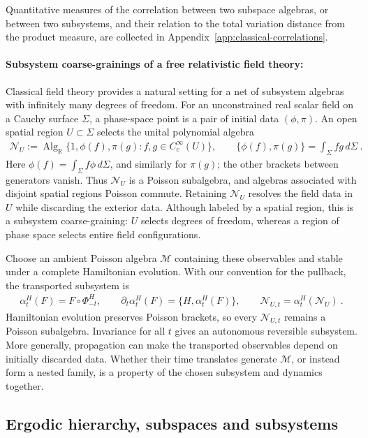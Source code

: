 \documentclass[a4paper,11pt]{article}
\theoremstyle{definition}
\begin{document}
Quantitative measures of the correlation between two subspace algebras, or between two subsystems, and their relation to the total variation distance from the product measure, are collected in Appendix~\ref{app:classical-correlations}.

\paragraph{Subsystem coarse-grainings of a free relativistic field theory:} Classical field theory provides a natural setting for a net of subsystem algebras with infinitely many degrees of freedom. For an unconstrained real scalar field on a Cauchy surface $\Sigma$, a phase-space point is a pair of initial data $(\phi,\pi)$. An open spatial region $U\subset\Sigma$ selects the unital polynomial algebra
\begin{align}
    \mathcal N_U
    :=\operatorname{Alg}_{\mathbb R}\{1,\phi(f),\pi(g):f,g\in C_c^\infty(U)\},
    \qquad
    \{\phi(f),\pi(g)\}=\int_\Sigma fg\,d\Sigma\ .
\end{align}
Here $\phi(f)=\int_\Sigma f\phi\,d\Sigma$, and similarly for $\pi(g)$; the other brackets between generators vanish. Thus $\mathcal N_U$ is a Poisson subalgebra, and algebras associated with disjoint spatial regions Poisson commute. Retaining $\mathcal N_U$ resolves the field data in $U$ while discarding the exterior data. Although labeled by a spatial region, this is a subsystem coarse-graining: $U$ selects degrees of freedom, whereas a region of phase space selects entire field configurations.


Choose an ambient Poisson algebra $\mathcal M$ containing these observables and stable under a complete Hamiltonian evolution. With our convention for the pullback, the transported subsystem is
\begin{align}
    \alpha_t^H(F)=F\circ\Phi_{-t}^H,
    \qquad \partial_t\alpha_t^H(F)=\{H,\alpha_t^H(F)\},
    \qquad \mathcal N_{U,t}=\alpha_t^H(\mathcal N_U)\ .
\end{align}
Hamiltonian evolution preserves Poisson brackets, so every $\mathcal N_{U,t}$ remains a Poisson subalgebra. Invariance for all $t$ gives an autonomous reversible subsystem. More generally, propagation can make the transported observables depend on initially discarded data. Whether their time translates generate $\mathcal M$, or instead form a nested family, is a property of the chosen subsystem and dynamics together.


\subsection{Ergodic hierarchy, subspaces and subsystems}
\label{subsec:classical-ergodic-hierarchy}
\end{document}
